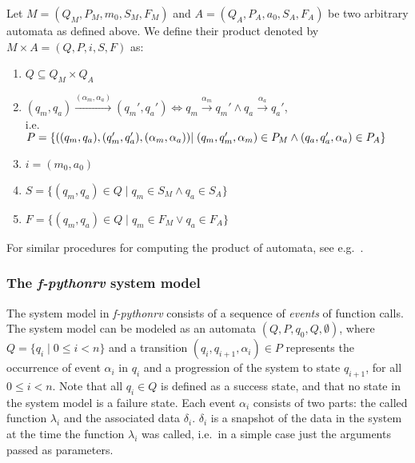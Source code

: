 \begin{mydef}
Let $M = (Q_M,P_M,m_0,S_M,F_M)$ and $A = (Q_A,P_A,a_0,S_A,F_A)$ be two
arbitrary automata as defined above. We define their product denoted by $M
\times A = (Q,P,i,S,F)$ as:

\begin{enumerate}
  \item $Q \subseteq Q_M \times Q_A$
  \item $(q_m,q_a) \xrightarrow{(\alpha_m,\alpha_a)} (q_m',q_a')
    \Leftrightarrow q_m \xrightarrow{\alpha_m} q_m' \wedge q_a \xrightarrow{\alpha_a} q_a'$,\\
    i.e.\\
    $P = \{((q_m,q_a),(q_m',q_a'),(\alpha_m,\alpha_a)) \\
    | \; (q_m,q_m',\alpha_m) \in P_M \wedge (q_a,q_a',\alpha_a) \in P_A\}$
  \item $i = (m_0,a_0)$
  \item $S = \{(q_m,q_a) \in Q \; | \; q_m \in S_M \wedge q_a \in S_A\}$
  \item $F = \{(q_m,q_a) \in Q \; | \; q_m \in F_M \vee q_a \in F_A\}$
\end{enumerate}

\end{mydef}

For similar procedures for computing the product of automata, see e.g.\
\cite{chaki04lks, schneider04kripke}.

\subsubsection{The \textit{f-pythonrv} system model}

The system model in \textit{f-pythonrv} consists of a sequence of
\textit{events} of function calls. The system model can be modeled as an
automata $(Q, P, q_0, Q, \emptyset)$, where $Q = \{q_i \; | \; 0 \leq i < n\}$
and a transition $(q_i, q_{i+1}, \alpha_i) \in P$ represents the occurrence of
event $\alpha_i$ in $q_i$ and a progression of the system to state $q_{i+1}$,
for all $0 \leq i < n$. Note that all $q_i \in  Q$ is defined as a success
state, and that no state in the system model is a failure state. Each event
$\alpha_i$ consists of two parts: the called function $\lambda_i$ and the
associated data $\delta_i$. $\delta_i$ is a snapshot of the data in the system
at the time the function $\lambda_i$ was called, i.e.\ in a simple case just
the arguments passed as parameters.

